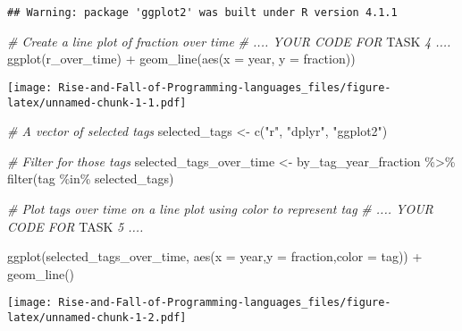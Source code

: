 \documentclass[
]{article}
\newenvironment{Shaded}{\begin{snugshade}}{\end{snugshade}}
\newcommand{\AlertTok}[1]{\textcolor[rgb]{0.94,0.16,0.16}{#1}}
\newcommand{\AttributeTok}[1]{\textcolor[rgb]{0.77,0.63,0.00}{#1}}
\newcommand{\CommentTok}[1]{\textcolor[rgb]{0.56,0.35,0.01}{\textit{#1}}}
\newcommand{\FunctionTok}[1]{\textcolor[rgb]{0.00,0.00,0.00}{#1}}
\newcommand{\NormalTok}[1]{#1}
\newcommand{\OtherTok}[1]{\textcolor[rgb]{0.56,0.35,0.01}{#1}}
\newcommand{\SpecialCharTok}[1]{\textcolor[rgb]{0.00,0.00,0.00}{#1}}
\newcommand{\StringTok}[1]{\textcolor[rgb]{0.31,0.60,0.02}{#1}}
\begin{document}
\begin{verbatim}
## Warning: package 'ggplot2' was built under R version 4.1.1
\end{verbatim}

\begin{Shaded}
\begin{Highlighting}[]
\CommentTok{\# Create a line plot of fraction over time}
\CommentTok{\# .... YOUR CODE FOR }\AlertTok{TASK}\CommentTok{ 4 ....}
\FunctionTok{ggplot}\NormalTok{(r\_over\_time) }\SpecialCharTok{+}
  \FunctionTok{geom\_line}\NormalTok{(}\FunctionTok{aes}\NormalTok{(}\AttributeTok{x =}\NormalTok{ year, }\AttributeTok{y =}\NormalTok{ fraction))}
\end{Highlighting}
\end{Shaded}

\texttt{[image: Rise-and-Fall-of-Programming-languages\_files/figure-latex/unnamed-chunk-1-1.pdf]}

\begin{Shaded}
\begin{Highlighting}[]
\CommentTok{\# A vector of selected tags}
\NormalTok{selected\_tags }\OtherTok{\textless{}{-}} \FunctionTok{c}\NormalTok{(}\StringTok{"r"}\NormalTok{, }\StringTok{"dplyr"}\NormalTok{, }\StringTok{"ggplot2"}\NormalTok{)}

\CommentTok{\# Filter for those tags}
\NormalTok{selected\_tags\_over\_time }\OtherTok{\textless{}{-}}\NormalTok{ by\_tag\_year\_fraction }\SpecialCharTok{\%\textgreater{}\%}
  \FunctionTok{filter}\NormalTok{(tag }\SpecialCharTok{\%in\%}\NormalTok{ selected\_tags)}

\CommentTok{\# Plot tags over time on a line plot using color to represent tag}
\CommentTok{\# .... YOUR CODE FOR }\AlertTok{TASK}\CommentTok{ 5 ....}


\FunctionTok{ggplot}\NormalTok{(selected\_tags\_over\_time, }\FunctionTok{aes}\NormalTok{(}\AttributeTok{x =}\NormalTok{ year,}\AttributeTok{y =}\NormalTok{ fraction,}\AttributeTok{color =}\NormalTok{ tag)) }\SpecialCharTok{+} \FunctionTok{geom\_line}\NormalTok{()}
\end{Highlighting}
\end{Shaded}

\texttt{[image: Rise-and-Fall-of-Programming-languages\_files/figure-latex/unnamed-chunk-1-2.pdf]}
\end{document}
